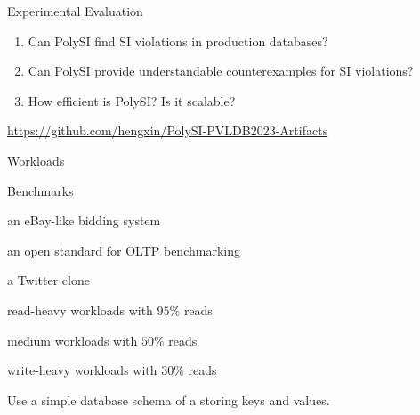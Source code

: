 
\begin{frame}{Experimental Evaluation}
	\begin{center}
		\begin{enumerate}[(1)]
			\setlength{\itemsep}{15pt}
			\item {}
			  Can PolySI find SI violations in production databases?
			\item {}
			  Can PolySI provide understandable counterexamples for SI violations?
			\item {}
			  How efficient is PolySI? Is it scalable?
		\end{enumerate}

		\vspace{0.50cm}
		\url{https://github.com/hengxin/PolySI-PVLDB2023-Artifacts}
	\end{center}
\end{frame}

\begin{frame}{Workloads}
	\begin{center}
		{}
	\end{center}
\end{frame}

\begin{frame}{Benchmarks}
	\begin{center}
		\begin{description}[GeneralRW:]
			\setlength{\itemsep}{10pt}
			\item[RuBis:] an eBay-like bidding system
			\item[TPC-C:] an open standard for OLTP benchmarking
			\item[C-Twitter:] a Twitter clone
			\vspace{10pt}
			\item[GeneralRH:] read-heavy workloads with $95\%$ reads
			\item[GeneralRW:] medium workloads with $50\%$ reads
			\item[GeneralWH:] write-heavy workloads with $30\%$ reads
		\end{description}
	\end{center}

	\begin{center}
		Use a simple database schema of a  storing keys and values.
	\end{center}
\end{frame}

